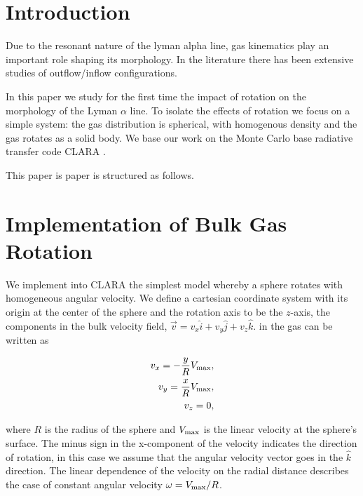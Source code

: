 \documentclass[usenatbib]{mn2e}
\begin{document}
\section{Introduction}
\label{sec:intro}

Due to the resonant nature of the lyman alpha line, gas kinematics
play an important role shaping its morphology. In the literature there
has been extensive studies of outflow/inflow configurations. 

In this paper we study for the first time the impact of rotation on
the morphology of the Lyman $\alpha$ line. To isolate the effects of
rotation we focus on a simple system: the gas distribution is
spherical, with homogenous density and the gas rotates as a solid
body. We base our work on the Monte Carlo base radiative transfer code
CLARA \citep{CLARA}. 

This paper is paper is structured as follows.



\section{Implementation of Bulk Gas Rotation}
\label{sec:implementation}

We implement into CLARA the simplest model whereby a sphere rotates
with homogeneous angular velocity. We define a cartesian coordinate
system with its origin at the center of the sphere and the rotation
axis to be the $z$-axis, the components in the bulk velocity field, $\vec{v}
= v_{x}\hat{i} + v_{y}\hat{j} + v_{z}\hat{k}$. in the gas can be written as 
 
\begin{subequations}
\begin{align}
    v_{x}=-\dfrac{y}{R}V_{\rm max}, \label{subeq1}\\
    v_{y}=\dfrac{x}{R}V_{\rm max}, \label{subeq2}\\
    v_{z}=0, \label{subeq3}
\end{align}
\end{subequations}

where $R$ is the radius of the sphere and $V_{\rm max}$ is the linear
velocity at the sphere's surface. The minus sign in the x-component of
the velocity indicates the direction of rotation, in this case we
assume that the angular velocity vector goes in the $\hat{k}$
direction.  The linear dependence of the velocity on the radial
distance describes the case of constant angular velocity
$\omega=V_{\rm max}/R$.  
\end{document}
